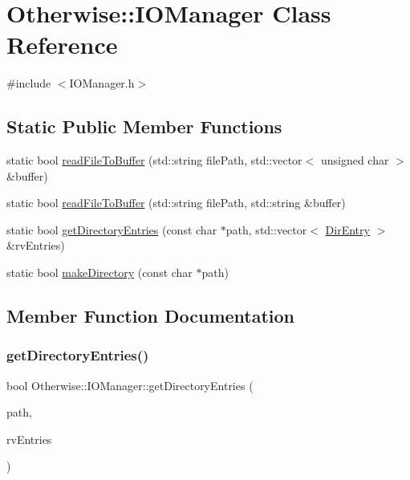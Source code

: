 \hypertarget{class_otherwise_1_1_i_o_manager}{}\section{Otherwise\+:\+:I\+O\+Manager Class Reference}
\label{class_otherwise_1_1_i_o_manager}


{\ttfamily \#include $<$I\+O\+Manager.\+h$>$}

\subsection*{Static Public Member Functions}
\begin{DoxyCompactItemize}
\item 
static bool \hyperlink{class_otherwise_1_1_i_o_manager_a8d9807a4bfc36dbb3d618f9000172a73}{read\+File\+To\+Buffer} (std\+::string file\+Path, std\+::vector$<$ unsigned char $>$ \&buffer)
\item 
static bool \hyperlink{class_otherwise_1_1_i_o_manager_aff26379085e76bf6d47e8d8bc68cb81f}{read\+File\+To\+Buffer} (std\+::string file\+Path, std\+::string \&buffer)
\item 
static bool \hyperlink{class_otherwise_1_1_i_o_manager_a7ee00799e0bd141429a62f61983267e7}{get\+Directory\+Entries} (const char $\ast$path, std\+::vector$<$ \hyperlink{struct_otherwise_1_1_dir_entry}{Dir\+Entry} $>$ \&rv\+Entries)
\item 
static bool \hyperlink{class_otherwise_1_1_i_o_manager_a0116ccf04706fc594a42107fe12054d6}{make\+Directory} (const char $\ast$path)
\end{DoxyCompactItemize}


\subsection{Member Function Documentation}
\mbox{\label{class_otherwise_1_1_i_o_manager_a7ee00799e0bd141429a62f61983267e7}} 
\subsubsection{\texorpdfstring{get\+Directory\+Entries()}{getDirectoryEntries()}}
{\footnotesize\ttfamily bool Otherwise\+::\+I\+O\+Manager\+::get\+Directory\+Entries (\begin{DoxyParamCaption}\item[{const char $\ast$}]{path,  }\item[{std\+::vector$<$ \hyperlink{struct_otherwise_1_1_dir_entry}{Dir\+Entry} $>$ \&}]{rv\+Entries }\end{DoxyParamCaption})\hspace{0.3cm}{\ttfamily [static]}}

